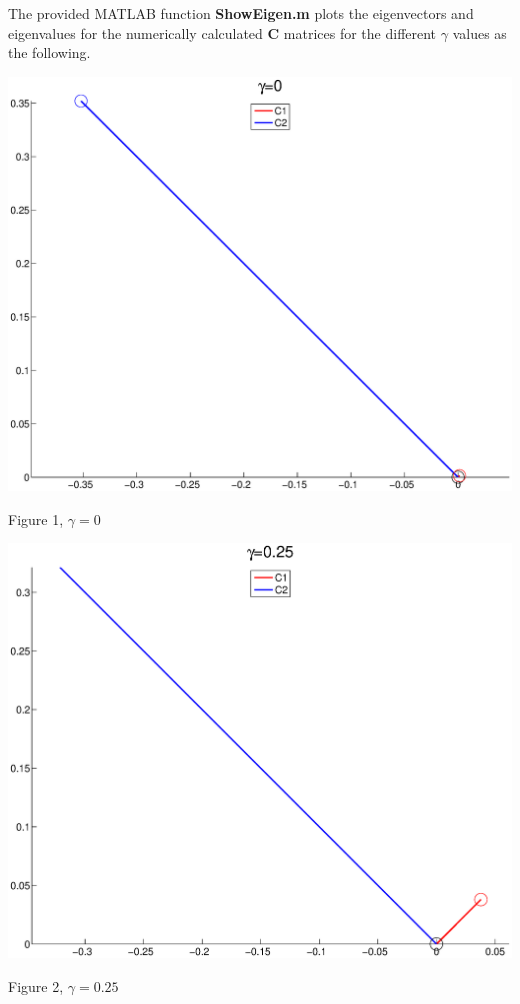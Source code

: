 \documentclass{article}
\begin{document}
The provided MATLAB function \textbf{ShowEigen.m} plots the eigenvectors and eigenvalues for the numerically calculated \textbf{C} matrices for the different $\gamma$ values as the following.

\begin{center}
\includegraphics[width=\textwidth]{eigen1.eps}
\begin{footnotesize}
 Figure 1, $\gamma=0$
\end{footnotesize}
\end{center}

\begin{center}
\includegraphics[width=\textwidth]{eigen2.eps}
\begin{footnotesize}
 Figure 2, $\gamma=0.25$
\end{footnotesize}
\end{center}
\end{document}
